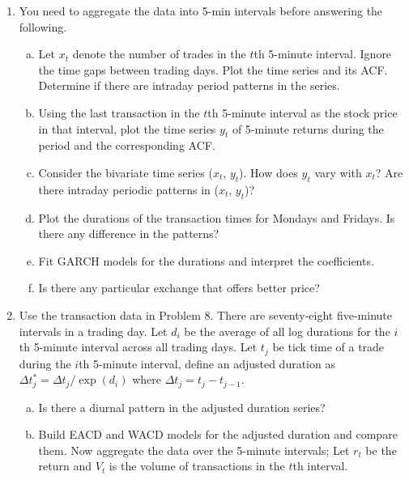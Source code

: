 \begin{enumerate}[1.]
 
\item You need to aggregate the data into 5-min intervals before answering the following.
\begin{enumerate}[(a)]
\item Let $x_t$ denote the number of trades in the $t$th 5-minute interval. Ignore the time gaps between trading days. Plot the time series and its ACF. Determine if there are intraday period patterns in the series.

\item Using the last transaction in the $t$th 5-minute interval as the stock price in that interval, plot the
time series $y_t$ of 5-minute returns during the period and the corresponding ACF.

\item Consider the bivariate time series ($x_t$, $y_t$). How does $y_t$ vary with $x_t$? Are there intraday periodic patterns in ($x_t$, $y_t$)?

\item Plot the durations of the transaction times for Mondays and Fridays. Is there any difference in the
patterns?

\item Fit GARCH models for the durations and interpret the coefficients.

\item Is there any particular exchange that offers better price?
\end{enumerate}



\item Use the transaction data in Problem 8. There are seventy-eight five-minute intervals in a trading day. Let $d_i$ be the average of all log durations for the $i$th 5-minute interval across all trading days. Let $t_j$ be tick time of a trade during the $i$th 5-minute interval, define an adjusted duration as $\Delta t_j^* = \Delta t_j/\exp(d_i)$ where $\Delta t_j = t_j - t_{j-1}$.
\begin{enumerate}[(a)]
\item Is there a diurnal pattern in the adjusted duration series?

\item Build EACD and WACD models for the adjusted duration and compare them. Now aggregate the data over the 5-minute intervals; Let $r_t$ be the return and $V_t$ is the volume of transactions in the $t$th interval.


\end{enumerate}
\end{enumerate}

